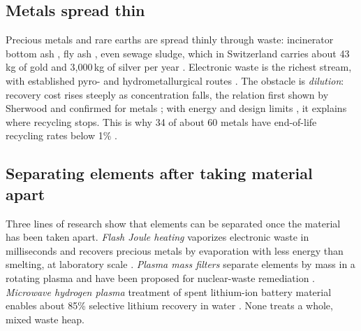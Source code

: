 \documentclass[11pt,a4paper]{article}
\begin{document}
\subsection{Metals spread thin}
Precious metals and rare earths are spread thinly through waste: incinerator bottom ash \citep{morf2013}, fly ash \citep{weibel2021,zucha2020}, even sewage sludge, which in Switzerland carries about 43\,kg of gold and 3,000\,kg of silver per year \citep{vriens2017}. Electronic waste is the richest stream, with established pyro- and hydrometallurgical routes \citep{cui2008,lu2016}. The obstacle is \emph{dilution}: recovery cost rises steeply as concentration falls, the relation first shown by Sherwood \citep{sherwood1959} and confirmed for metals \citep{johnson2007,dahmus2007}; with energy \citep{gutowski2013} and design limits \citep{reck2012}, it explains where recycling stops. This is why 34 of about 60 metals have end-of-life recycling rates below 1\% \citep{graedel2011}.

\subsection{Separating elements after taking material apart}
Three lines of research show that elements can be separated once the material has been taken apart. \emph{Flash Joule heating} vaporizes electronic waste in milliseconds and recovers precious metals by evaporation with less energy than smelting, at laboratory scale \citep{deng2021}. \emph{Plasma mass filters} separate elements by mass in a rotating plasma and have been proposed for nuclear-waste remediation \citep{gueroult2015,zweben2018}. \emph{Microwave hydrogen plasma} treatment of spent lithium-ion battery material enables about 85\% selective lithium recovery in water \citep{chandrasekhar2026}. None treats a whole, mixed waste heap.
\end{document}
